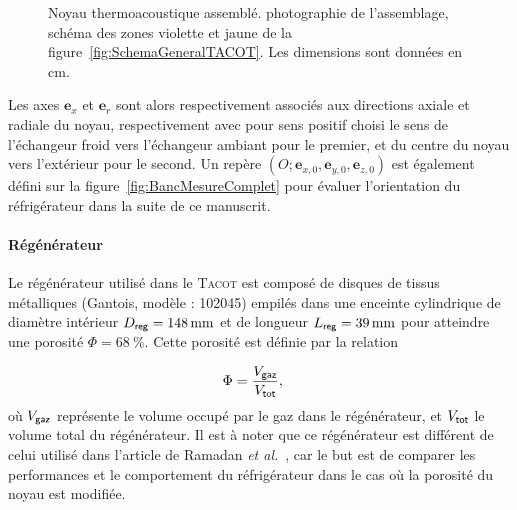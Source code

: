 \begin{figure}[!ht]
    \centering
	\begin{subfigure}[c]{.49\textwidth}
		\centering
		\caption{}
		\label{fig:PhotoNoyau}
	\end{subfigure}		
	\begin{subfigure}[c]{.49\textwidth}
		\centering
		
		\caption{}
		\label{fig:SchemaNoyau}
	\end{subfigure}	    
    \caption{Noyau thermoacoustique assemblé.  photographie de l'assemblage,  schéma des zones violette et jaune de la figure~\ref{fig:SchemaGeneralTACOT}. Les dimensions sont données en \unit{\centi\meter}.}
    \label{fig:PhotoSchemaNoyau}
\end{figure}


Les axes $\mathbf e_x$ et $\mathbf e_r$ sont alors respectivement associés aux directions axiale et radiale du noyau, respectivement avec pour sens positif choisi le sens de l'échangeur froid vers l'échangeur ambiant pour le premier, et du centre du noyau vers l'extérieur pour le second. Un repère $(O;\mathbf e_{x,0},\mathbf e_{y,0},\mathbf e_{z,0})$ est également défini sur la figure~\ref{fig:BancMesureComplet} pour évaluer l'orientation du réfrigérateur dans la suite de ce manuscrit.\medskip

\paragraph{Régénérateur} Le régénérateur utilisé dans le \textsc{Tacot} est composé de  disques de tissus métalliques (Gantois, modèle : 102045) empilés dans une enceinte cylindrique de diamètre intérieur $D_{\sf reg}=\qty{148}{\mm}$ et de longueur $L_{\sf reg}=\qty{39}{\mm}$ pour atteindre une porosité $\Phi=\qty{68}{\percent}$. Cette porosité est définie par la relation

\begin{align}
	\Phi &= \frac{V_{\sf gaz}}{V_{\sf tot}}, \label{eq:Porosite_Volume}%
\end{align}
où $V_{\sf gaz}$ représente le volume occupé par le gaz dans le régénérateur, et $V_{\sf tot}$ le volume total du régénérateur. Il est à noter que ce régénérateur est différent de celui utilisé dans l'article de Ramadan \textit{et al.}~\cite{ramadan_design_2021}, car le but est de comparer les performances et le comportement du réfrigérateur dans le cas où la porosité du noyau est modifiée. 

